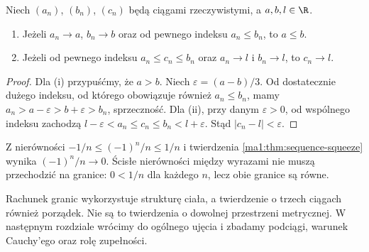 \begin{twierdzenie}
\label{ma1:thm:sequence-squeeze}
Niech $(a_n)$, $(b_n)$, $(c_n)$ będą ciągami rzeczywistymi, a $a,b,l\in\R$.
\begin{enumerate}[label=(\roman*)]
\item Jeżeli $a_n\to a$, $b_n\to b$ oraz od pewnego indeksu $a_n\le b_n$, to $a\le b$.
\item Jeżeli od pewnego indeksu $a_n\le c_n\le b_n$ oraz $a_n\to l$ i $b_n\to l$, to $c_n\to l$.
\end{enumerate}
\end{twierdzenie}
\begin{proof}
Dla (i) przypuśćmy, że $a>b$. Niech $\varepsilon=(a-b)/3$. Od dostatecznie dużego indeksu, od którego obowiązuje również $a_n\le b_n$, mamy $a_n>a-\varepsilon>b+\varepsilon>b_n$, sprzeczność.
Dla (ii), przy danym $\varepsilon>0$, od wspólnego indeksu zachodzą $l-\varepsilon<a_n\le c_n\le b_n<l+\varepsilon$. Stąd $|c_n-l|<\varepsilon$.
\end{proof}
\begin{przyklad}
Z nierówności $-1/n\le(-1)^n/n\le1/n$ i twierdzenia \ref{ma1:thm:sequence-squeeze} wynika $(-1)^n/n\to0$. Ścisłe nierówności między wyrazami nie muszą przechodzić na granice: $0<1/n$ dla każdego $n$, lecz obie granice są równe.
\end{przyklad}

\begin{uwaga}
Rachunek granic wykorzystuje strukturę ciała, a twierdzenie o trzech ciągach również porządek. Nie są to twierdzenia o dowolnej przestrzeni metrycznej. W następnym rozdziale wrócimy do ogólnego ujęcia i zbadamy podciągi, warunek Cauchy'ego oraz rolę zupełności.
\end{uwaga}
